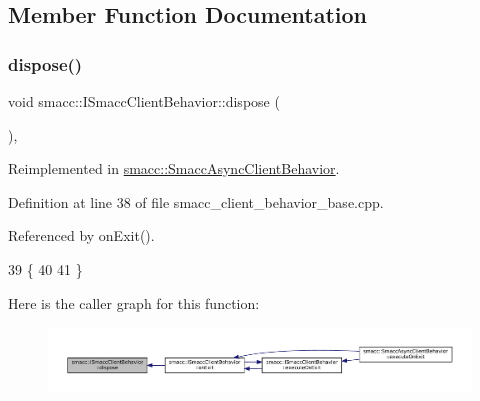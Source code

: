 \subsection{Member Function Documentation}
\mbox{\label{classsmacc_1_1ISmaccClientBehavior_abdc74a8d95fdd02794c19dfa90f8a6ce}} 
\subsubsection{\texorpdfstring{dispose()}{dispose()}}
{\footnotesize\ttfamily void smacc\+::\+I\+Smacc\+Client\+Behavior\+::dispose (\begin{DoxyParamCaption}{ }\end{DoxyParamCaption})\hspace{0.3cm}{\ttfamily [protected]}, {\ttfamily [virtual]}}



Reimplemented in \hyperlink{classsmacc_1_1SmaccAsyncClientBehavior_af475cee853947a8d3f513c7fb9789e7a}{smacc\+::\+Smacc\+Async\+Client\+Behavior}.



Definition at line 38 of file smacc\+\_\+client\+\_\+behavior\+\_\+base.\+cpp.



Referenced by on\+Exit().


\begin{DoxyCode}
39     \{
40 
41     \}
\end{DoxyCode}
Here is the caller graph for this function\+:
\nopagebreak
\begin{figure}[H]
\begin{center}
\leavevmode
\includegraphics[width=350pt]{classsmacc_1_1ISmaccClientBehavior_abdc74a8d95fdd02794c19dfa90f8a6ce_icgraph}
\end{center}
\end{figure}
\mbox{\label{classsmacc_1_1ISmaccClientBehavior_a90b7032f7520f9e7e805835e6ed9d43e}} 
